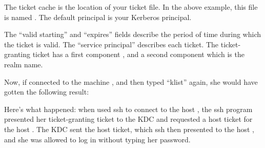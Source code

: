 \documentclass[letterpaper,10pt,english]{sphinxmanual}
\begin{document}
The ticket cache is the location of your ticket file. In the above
example, this file is named . The default
principal is your Kerberos principal.

The “valid starting” and “expires” fields describe the period of time
during which the ticket is valid.  The “service principal” describes
each ticket.  The ticket-granting ticket has a first component
, and a second component which is the realm name.

Now, if  connected to the machine ,
and then typed “klist” again, she would have gotten the following
result:

%
\begin{sphinxVerbatim}[commandchars=\\\{\}]
 
  
  

                   
      
      
\end{sphinxVerbatim}

Here’s what happened: when  used ssh to connect to the
host , the ssh program presented her
ticket-granting ticket to the KDC and requested a host ticket for the
host .  The KDC sent the host ticket, which ssh
then presented to the host , and she was allowed
to log in without typing her password.
\end{document}
